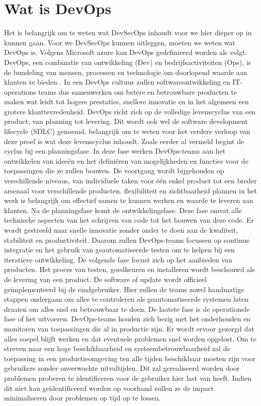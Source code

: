 \section{Wat is DevOps}
Het is belangrijk om te weten wat DevSecOps inhoudt voor we hier dieper op in kunnen gaan. Voor we DevSecOps kunnen uitleggen, moeten we weten wat DevOps is. Volgens Microsoft azure kan DevOps gedefinieerd worden als volgt. DevOps, een combinatie van ontwikkeling (Dev) en bedrijfsactiviteiten (Ops), is de bundeling van mensen, processen en technologie om doorlopend waarde aan klanten te bieden \autocite{Azure}. In een DevOps cultuur zullen softwareontwikkeling en IT-operations teams dus samenwerken om betere en betrouwbare producten te maken wat leidt tot hogere prestaties, snellere innovatie en in het algemeen een grotere klanttevredenheid. DevOps richt zich op de volledige levenscyclus van een product, van planning tot levering. Dit wordt ook wel de software development lifecycle (SDLC) genoemd. belangrijk om te weten voor het verdere verloop van deze proef is wat deze levenscyclus inhoudt. Zoals eerder al vermeld begint de cyclus bij een planningsfase. In deze fase werken DevOps-teams aan het ontwikkelen van ideeën en het definiëren van mogelijkheden en functies voor de toepassingen die ze zullen bouwen. De voortgang wordt bijgehouden op verschillende niveaus, van individuele taken voor één enkel product tot een breder arsenaal voor verschillende producten. flexibiliteit en zichtbaarheid plannen in het werk is belangrijk om effectief samen te kunnen werken en waarde te leveren aan klanten. Na de planningsfase komt de ontwikkelingsfase. Deze fase omvat alle technische aspecten van het schrijven van code tot het bouwen van deze code. Er wordt gestreefd naar snelle innovatie zonder onder te doen aan de kwaliteit, stabiliteit en productiviteit. Daarom zullen DevOps-teams focussen op continue integratie en het gebruik van geautomatiseerde testen om te helpen bij een iteratieve ontwikkeling. De volgende fase focust zich op het aanbieden van producten. Het proces van testen, goedkeuren en installeren wordt beschouwd als de levering van een product. De software of update wordt officieel geïmplementeerd bij de eindgebruiker. Hier zullen de teams zowel handmatige stappen ondergaan om alles te controleren als geautomatiseerde systemen laten draaien om alles snel en betrouwbaar te doen. De laatste fase is de operationele fase of het uitvoeren. DevOps-teams houden zich bezig met het onderhouden en monitoren van toepassingen die al in productie zijn. Er wordt ervoor gezorgd dat alles soepel blijft werken en dat eventuele problemen snel worden opgelost. Om te streven naar een hoge beschikbaarheid en systeembetrouwbaarheid zal de toepassing in een productieomgeving ten alle tijden beschikbaar moeten zijn voor gebruikers zonder onverwachte uitvaltijden. Dit zal gerealiseerd worden door problemen proberen te identificeren voor de gebruiker hier last van heeft. Indien dit niet kan geïdentificeerd worden op voorhand zullen ze de impact minimaliseren door problemen op tijd op te lossen. 

